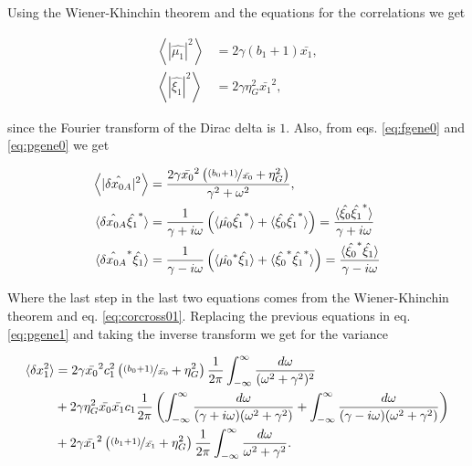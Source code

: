 Using the Wiener-Khinchin theorem and the equations for the correlations we get

\begin{align*}
  \left\langle|\hat{\mu_1}|^2\right\rangle &= 2\gamma(b_1+1)\bar{x_1},\\
  \left\langle|\hat{\xi_1}|^2\right\rangle &= 2\gamma\eta_G^2\bar{x_1}^2,
\end{align*}

since the Fourier transform of the Dirac delta is $1$. Also, from eqs. \eqref{eq:fgene0} and \eqref{eq:pgene0} we get

\begin{align*}
\left\langle|\hat{\delta x_{0A}}|^2\right\rangle &= \frac{2\gamma\bar{x_0}^2\left(\nicefrac{(b_0+1)}{\bar{x_0}}+ \eta_G^2\right)}{\gamma^2+\omega^2},\\
\langle\hat{\delta x_{0A}}\hat{\xi_1}^*\rangle &= \frac{1}{\gamma+i\omega}\left(\langle\hat{\mu_0}\hat{\xi_1}^*\rangle + \langle\hat{\xi_0}\hat{\xi_1}^*\rangle \right) = \frac{\langle\hat{\xi_0}\hat{\xi_1}^*\rangle}{\gamma+i\omega}\\
\langle\hat{\delta x_{0A}}^*\hat{\xi_1}\rangle &= \frac{1}{\gamma-i\omega}\left(\langle\hat{\mu_0}^*\hat{\xi_1}\rangle + \langle\hat{\xi_0}^*\hat{\xi_1}^*\rangle \right) = \frac{\langle\hat{\xi_0}^*\hat{\xi_1}\rangle}{\gamma-i\omega}
\end{align*}

Where the last step in the last two equations comes from the Wiener-Khinchin theorem and eq. \eqref{eq:corcross01}. Replacing the previous equations in eq. \eqref{eq:pgene1} and taking the inverse transform we get for the variance

\begin{equation}
  \begin{split}
    \langle \delta x_1^2\rangle &= 2\gamma\bar{x_0}^2c_1^2\left(\nicefrac{(b_0+1)}{\bar{x_0}}+ \eta_G^2\right)\frac{1}{2\pi}\int_{-\infty}^{\infty}\frac{d\omega}{(\omega^2+\gamma^2)^2}\\
    &+2\gamma\eta_G^2\bar{x_0}\bar{x_1}c_1\frac{1}{2\pi}\left(\int_{-\infty}^{\infty}\frac{d\omega}{(\gamma + i\omega)(\omega^2+\gamma^2)} + \int_{-\infty}^{\infty}\frac{d\omega}{(\gamma - i\omega)(\omega^2+\gamma^2)}\right)\\
    &+2\gamma\bar{x_1}^2 \left(\nicefrac{(b_1+1)}{\bar{x_1}}+\eta_G^2\right)\frac{1}{2\pi}\int_{-\infty}^{\infty}\frac{d\omega}{\omega^2+\gamma^2}.
  \end{split}
\end{equation} 

